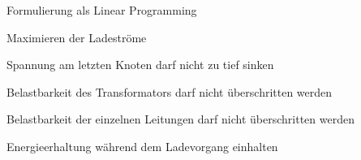 \documentclass[aspectratio=169]{beamer}
\begin{document}
\begin{frame}{Formulierung als Linear Programming}
	\begin{description}[Zielfunktion]
		\item[Zielfunktion] Maximieren der Ladeströme
		\item[Restriktion] Spannung am letzten Knoten darf nicht zu tief sinken
		\item[Restriktion] Belastbarkeit des Transformators darf nicht
		überschritten werden
		\item[Restriktion] Belastbarkeit der einzelnen Leitungen darf nicht
		überschritten werden
		\item[Restriktion] Energieerhaltung während dem Ladevorgang einhalten
	\end{description}
	
\end{frame}
\end{document}
